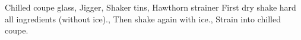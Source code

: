 \documentclass[../main.tex]{subfiles}
\begin{document}
\cocktailDivider

{Chilled coupe glass, Jigger, Shaker tins, Hawthorn strainer}
{
    {First dry shake hard all ingredients (without ice).},
    {Then shake again with ice.},
    {Strain into chilled coupe.}
}
\end{document}
